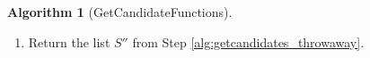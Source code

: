 \documentclass{dcthesis}
\newcommand{\ZZ}{\mathbb Z}
\newcommand{\mm}[1]{{\color{blue} \sf MM: [#1]}}
\newcommand{\wt}[1]{\widetilde{#1}}
\newcommand{\LL}{\mathscr L}
\newcommand{\FF}{\mathbb{F}}
\DeclareMathOperator{\Div}{Div}
\DeclareMathOperator{\Gal}{Gal}
\numberwithin{equation}{section}
\theoremstyle{definition}
\newtheorem{alg}[equation]{Algorithm}
\theoremstyle{remark}
\begin{document}
{{{\begin{alg}[GetCandidateFunctions]
\begin{enumerate}
        \begin{itemize}
          \item
            If $S$ is nonempty,
            then
            for each $f_a\in S$
            compute
            $F(\sqrt{f_a})$,
            \[
              G_a\cong\Gal(F(\sqrt{f_a})\,|\,\FF_q(x)),
            \]
            and let
            $S''=
            \{f_a\in S:G_a\cong\wt{G}\}$.
          \item
            If $S$ is empty,
            then
            for each $f_a\in S'$
            compute
            $F'(\sqrt{f_a})$,
            \[
              G_a\cong\Gal(F'(\sqrt{f_a})\,|\,\FF_{q^2}(x)),
            \]
            and let
            $S''=
            \{f_a\in S':G_a\cong\wt{G}\}$.
        \end{itemize}
        \item\label{alg:getcandidates_return}
          Return the list $S''$ from
          Step
          \ref{alg:getcandidates_throwaway}.
      \end{enumerate}

\end{alg}}}}
\end{document}
